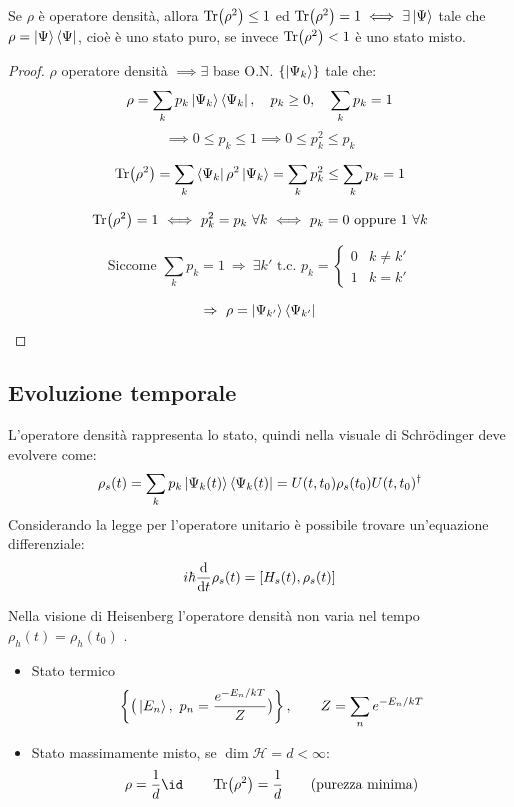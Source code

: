 \begin{theorem}
    Se \(\rho\) è operatore densità, allora \(\Tr (\rho^2)\leq 1\) ed \(\Tr(\rho^2)= 1 \iff \exists \ket{\Psi} \) tale che \(\rho = \ket{\Psi}\bra{\Psi}\), cioè è uno stato puro, se invece \(\Tr(\rho^2)< 1\) è uno stato misto.
\end{theorem}
\begin{proof}
    \(\rho\) operatore densità \(\implies \exists\) base O.N. \(\left\{ \ket{\Psi_k} \right\}\) tale che:
    \[
    \rho = \sum_k p_k \ket{\Psi_k}\bra{\Psi_k}, 
    \quad p_k \ge 0, 
    \quad \sum_k p_k = 1
    \]
    \[
     \implies 0 \le p_k \le 1 
   \implies
    0 \le p_k^2 \le p_k
    \]

    \[
    \Tr(\rho^2)
    = \sum_k \bra{\Psi_k} \rho^2 \ket{\Psi_k}
    = \sum_k p_k^2 
    \le \sum_k p_k = 1
    \]

    \[
    \Tr(\rho^2) = 1 
    \ \Longleftrightarrow\ 
    p_k^2 = p_k \ \forall k 
    \ \Longleftrightarrow\ 
    p_k = 0 \text{ oppure } 1 \ \forall k
    \]

    \[
    \text{Siccome } \sum_k p_k = 1 
    \ \Rightarrow\ 
    \exists k' \text{ t.c. } 
    p_k = 
    \begin{cases}
    0 & k \neq k' \\
    1 & k = k'
    \end{cases}
    \]

    \[
    \Rightarrow\ 
    \rho = \ket{\Psi_{k'}}\bra{\Psi_{k'}}
    \]

\end{proof}


\subsection{Evoluzione temporale}
L'operatore densità rappresenta lo stato, quindi nella visuale di Schrödinger deve evolvere come:
\begin{equation}
    \rho_s(t)= \sum_k p_k \ket{\Psi_k(t)}\bra{\Psi_k(t)}= U(t,t_0)\rho_s(t_0)U (t, t_0)^\dagger
\end{equation}
Considerando la legge per l'operatore unitario è possibile trovare un'equazione differenziale:
\begin{equation}
    i\hbar \dv{t}\rho_s(t) = \left[ H_s(t), \rho_s(t) \right]
\end{equation}

Nella visione di Heisenberg l'operatore densità non varia nel tempo \(\rho_h(t) = \rho_h(t_0)\) .
\begin{example}
\begin{itemize}
    \item Stato termico
        \[
        \left\{ \big( \ket{E_n},\ p_n = \frac{e^{-E_n / kT}}{Z} \big) \right\},
        \qquad 
        Z = \sum_n e^{-E_n / kT}
        \]
    \item Stato massimamente misto, se $\dim \mathcal{H} = d < \infty$:
    \[
    \rho = \frac{1}{d} \id
    \qquad 
    \Tr(\rho^2) = \frac{1}{d} 
    \qquad \text{(purezza minima)}
    \]
\end{itemize}
\end{example}



